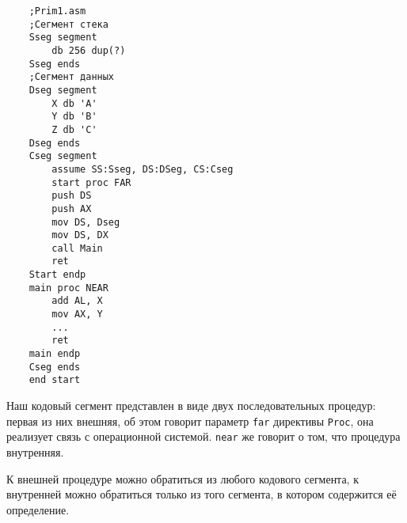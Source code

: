 \begin{verbatim}
    ;Prim1.asm
    ;Сегмент стека
    Sseg segment
        db 256 dup(?)
    Sseg ends
    ;Сегмент данных
    Dseg segment
        X db 'A'
        Y db 'B'
        Z db 'C'
    Dseg ends
    Cseg segment
        assume SS:Sseg, DS:DSeg, CS:Cseg
        start proc FAR
        push DS
        push AX
        mov DS, Dseg
        mov DS, DX
        call Main
        ret
    Start endp
    main proc NEAR
        add AL, X
        mov AX, Y
        ...
        ret
    main endp
    Cseg ends
    end start
\end{verbatim}

Наш кодовый сегмент представлен в виде двух последовательных процедур: первая из них
внешняя, об этом говорит параметр \verb|far| директивы \verb|Proc|, она реализует связь с операционной системой.
\verb|near| же говорит о том, что процедура внутренняя.

К внешней процедуре можно обратиться из любого кодового сегмента, к внутренней можно обратиться
только из того сегмента, в котором содержится её определение.
